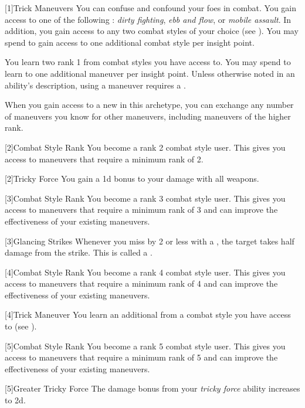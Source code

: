        {
            [1]{Trick Maneuvers}
            You can confuse and confound your foes in combat.
            You gain access to one of the following : \textit{dirty fighting}, \textit{ebb and flow}, or \textit{mobile assault}.
            In addition, you gain access to any two combat styles of your choice (see ).
            You may spend  to gain access to one additional combat style per insight point.

            You learn two rank 1  from combat styles you have access to.
            You may spend  to learn to one additional maneuver per insight point.
            Unless otherwise noted in an ability's description, using a maneuver requires a .

            When you gain access to a new  in this archetype,
                you can exchange any number of maneuvers you know for other maneuvers,
                including maneuvers of the higher rank.
        }

        {
            [2]{Combat Style Rank} You become a rank 2 combat style user.
            This gives you access to maneuvers that require a minimum rank of 2.

            [2]{Tricky Force} You gain a \plus1d bonus to your damage with all weapons.
        }

        {
            [3]{Combat Style Rank} You become a rank 3 combat style user.
            This gives you access to maneuvers that require a minimum rank of 3 and can improve the effectiveness of your existing maneuvers.

            [3]{Glancing Strikes} Whenever you miss by 2 or less with a , the target takes half damage from the strike.
            This is called a .
        }

        {
            [4]{Combat Style Rank} You become a rank 4 combat style user.
            This gives you access to maneuvers that require a minimum rank of 4 and can improve the effectiveness of your existing maneuvers.

            [4]{Trick Maneuver}
            You learn an additional  from a combat style you have access to (see ).
        }

        {
            [5]{Combat Style Rank} You become a rank 5 combat style user.
            This gives you access to maneuvers that require a minimum rank of 5 and can improve the effectiveness of your existing maneuvers.

            [5]{Greater Tricky Force} The damage bonus from your \textit{tricky force} ability increases to \plus2d.
        }

